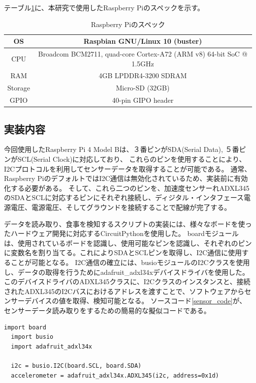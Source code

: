テーブル\ref{tb:raspberry_pi_spec}に、本研究で使用したRaspberry Piのスペックを示す。

\begin{table}[htbp]
  \caption{Raspberry Piのスペック}
  \label{tb:raspberry_pi_spec}
  \begin{center}
    \begin{tabular}{|c||c|}
      \hline
      OS  & Raspbian GNU/Linux 10 (buster) \\\hline
      CPU & Broadcom BCM2711, quad-core Cortex-A72 (ARM v8) 64-bit SoC @ 1.5GHz \\\hline
      RAM & 4GB LPDDR4-3200 SDRAM \\\hline
      Storage & Micro-SD (32GB) \\\hline
      GPIO & 40-pin GIPO header \\\hline
    \end{tabular}
  \end{center}
\end{table}

\subsection{実装内容}

今回使用したRaspberry Pi 4 Model Bは、３番ピンがSDA(Serial Data), ５番ピンがSCL(Serial Clock)に対応しており、
これらのピンを使用することにより、I2Cプロトコルを利用してセンサーデータを取得することが可能である。
通常、Raspberry PiのデフォルトではI2C通信は無効化されているため、実装前に有効化する必要がある。
そして、これら二つのピンを、加速度センサーれADXL345のSDAとSCLに対応するピンにそれぞれ接続し、ディジタル・インタフェース電源電圧、電源電圧、そしてグラウンドを接続することで配線が完了する。\cite{adxl345_datasheet}

データを読み取り、食事を検知するスクリプトの実装には、様々なボードを使ったハードウェア開発に対応するCircuitPythonを使用した。
boardモジュールは、使用されているボードを認識し、使用可能なピンを認識し、それぞれのピンに変数名を割り当てる。これによりSDAとSCLピンを取得し、I2C通信に使用することが可能となる。
I2C通信の確立には、busioモジュールのI2Cクラスを使用し、データの取得を行うためにadafruit\_adxl34xデバイスドライバを使用した。
このデバイスドライバのADXL345クラスに、I2Cクラスのインスタンスと、接続されたADXL345のI2Cバスにおけるアドレスを渡すことで、ソフトウェアからセンサーデバイスの値を取得、検知可能となる。
ソースコード\ref{sensor_code}が、センサーデータ読み取りをするための簡易的な擬似コードである。

\begin{lstlisting}[caption=センサーデータを読み取るための疑似コード,label=sensor_code]
  import board
  import busio
  import adafruit_adxl34x

  i2c = busio.I2C(board.SCL, board.SDA)
  accelerometer = adafruit_adxl34x.ADXL345(i2c, address=0x1d)
\end{lstlisting}

